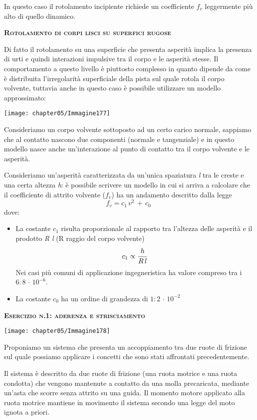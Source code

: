 In questo caso il rotolamento incipiente richiede un coefficiente $f_v$ leggermente più alto di quello dinamico.

\begin{center}
{\scshape{\bfseries Rotolamento di corpi lisci su superfici rugose}}
\end{center}

Di fatto il rotolamento su una superficie che presenta asperità implica la presenza di urti e quindi interazioni impulsive tra il corpo e le asperità stesse. Il comportamento a questo livello è piuttosto complesso in quanto dipende da come è distribuita l'irregolarità superficiale della pista sul quale rotola il corpo volvente, tuttavia anche in questo caso è possibile utilizzare un modello approssimato:
\begin{center}
\texttt{[image: chapter05/Immagine177]}
\end{center}

Consideriamo un corpo volvente sottoposto ad un certo carico normale, sappiamo che al contatto nascono due componenti (normale e tangenziale) e in questo modello nasce anche un'interazione al punto di contatto tra il corpo volvente e le asperità.

Consideriamo un'asperità caratterizzata da un'unica spaziatura \emph{l} tra le creste e una certa altezza \emph{h}: è possibile scrivere un modello in cui si arriva a calcolare che il coefficiente di attrito volvente ($f_v$) ha un andamento descritto dalla legge
\[f_v = c_1\,v^2\,+\,c_0\]
dove:
\begin{itemize}
\item La costante $c_1$ risulta proporzionale al rapporto tra l'altezza delle asperità e il prodotto \emph{R l} (R raggio del corpo volvente)
\[c_1 \propto \cfrac{h}{R\,l}\]
Nei casi più comuni di applicazione ingegneristica ha valore compreso tra i $6:8\,\cdot\,10^{-6}$.
\item La costante $c_0$ ha un ordine di grandezza di $1:2\,\cdot\,10^{-2}$
\end{itemize}

\begin{center}
{\scshape{\bfseries Esercizio n.1: aderenza e strisciamento}}
\end{center}

\begin{minipage}{.35\textwidth}
\centering
\texttt{[image: chapter05/Immagine178]}
\end{minipage}
\hfill
\begin{minipage}{.65\textwidth}
Proponiamo un sistema che presenta un accoppiamento tra due ruote di frizione sul quale possiamo applicare i concetti che sono stati affrontati precedentemente.

Il sistema è descritto da due ruote di frizione (una ruota motrice e una ruota condotta) che vengono mantenute a contatto da una molla precaricata, mediante un'asta che scorre senza attrito su una guida. Il momento motore applicato alla ruota motrice mantiene in movimento il sistema secondo una legge del moto ignota a priori.
\end{minipage}

